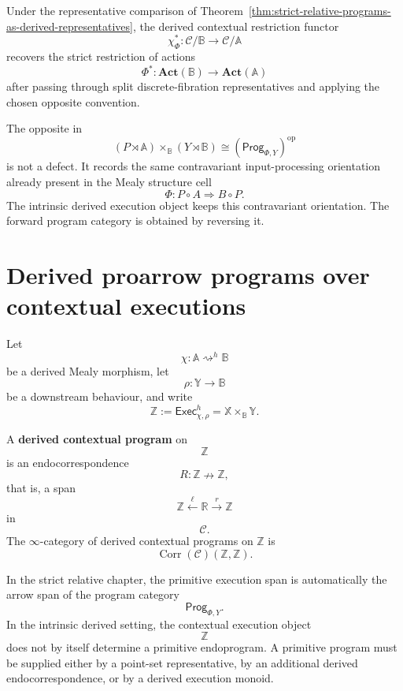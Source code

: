 \begin{corollary}
\label{cor:strict-restriction-derived-contextual}
Under the representative comparison of
Theorem~\ref{thm:strict-relative-programs-as-derived-representatives}, the
derived contextual restriction functor
\[
\chi_\Phi^\ast:\mathcal C/\mathbb B\to\mathcal C/\mathbb A
\]
recovers the strict restriction of actions
\[
\Phi^\ast:\mathbf{Act}(\mathbb B)\to\mathbf{Act}(\mathbb A)
\]
after passing through split discrete-fibration representatives and applying
the chosen opposite convention.
\end{corollary}

\begin{remark}
\label{rem:opposite-convention-strict-derived}
The opposite in
\[
(P\rtimes\mathbb A)\times_{\mathbb B}(Y\rtimes\mathbb B)
\cong
\left(\mathsf{Prog}_{\Phi,Y}\right)^{\mathrm{op}}
\]
is not a defect. It records the same contravariant input-processing
orientation already present in the Mealy structure cell
\[
\Phi:P\circ A\Rightarrow B\circ P.
\]
The intrinsic derived execution object keeps this contravariant orientation.
The forward program category is obtained by reversing it.
\end{remark}

\section{Derived proarrow programs over contextual executions}
\label{sec:derived-proarrow-programs-contextual}

Let
\[
\chi:\mathbb A\rightsquigarrow^h\mathbb B
\]
be a derived Mealy morphism, let
\[
\rho:\mathbb Y\to\mathbb B
\]
be a downstream behaviour, and write
\[
\mathbb Z
:=
\mathsf{Exec}^h_{\chi,\rho}
=
\mathbb X\times_{\mathbb B}\mathbb Y.
\]

\begin{definition}
\label{def:derived-contextual-program}
A \textbf{derived contextual program} on
\[
\mathbb Z
\]
is an endocorrespondence
\[
R:\mathbb Z\nrightarrow\mathbb Z,
\]
that is, a span
\[
\mathbb Z
\xleftarrow{\ell}
\mathbb R
\xrightarrow{r}
\mathbb Z
\]
in
\[
\mathcal C.
\]
The \(\infty\)-category of derived contextual programs on \(\mathbb Z\) is
\[
\operatorname{Corr}(\mathcal C)(\mathbb Z,\mathbb Z).
\]
\end{definition}

\begin{remark}
\label{rem:no-automatic-primitive-span-derived}
In the strict relative chapter, the primitive execution span is automatically
the arrow span of the program category
\[
\mathsf{Prog}_{\Phi,Y}.
\]
In the intrinsic derived setting, the contextual execution object
\[
\mathbb Z
\]
does not by itself determine a primitive endoprogram. A primitive program must
be supplied either by a point-set representative, by an additional derived
endocorrespondence, or by a derived execution monoid.
\end{remark}

